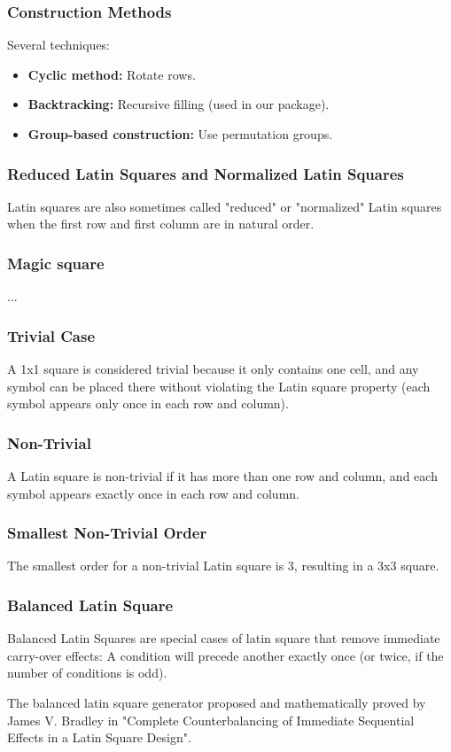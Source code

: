 \documentclass{beamer}
\begin{document}
\begin{frame}
\frametitle{Construction Methods}
Several techniques:
\begin{itemize}
  \item \textbf{Cyclic method:} Rotate rows.
  \item \textbf{Backtracking:} Recursive filling (used in our package).
  \item \textbf{Group-based construction:} Use permutation groups.
\end{itemize}
\end{frame}

\begin{frame}
\frametitle{Reduced Latin Squares and Normalized Latin Squares}
Latin squares are also sometimes called "reduced" or "normalized" Latin squares when the first row and first column are in natural order. 
\end{frame}

\begin{frame}
\frametitle{Magic square}
...
\end{frame}

\begin{frame}
\frametitle{Trivial Case}
A 1x1 square is considered trivial because it only contains one cell, and any symbol can be placed there without violating the Latin square property (each symbol appears only once in each row and column).
\end{frame}

\begin{frame}
\frametitle{Non-Trivial}
A Latin square is non-trivial if it has more than one row and column, and each symbol appears exactly once in each row and column.
\end{frame}

\begin{frame}
\frametitle{Smallest Non-Trivial Order}
The smallest order for a non-trivial Latin square is 3, resulting in a 3x3 square.
\end{frame}

\begin{frame}
\frametitle{Balanced Latin Square}
Balanced Latin Squares are special cases of latin square that remove immediate carry-over effects: A condition will precede another exactly once (or twice, if the number of conditions is odd).

The balanced latin square generator proposed and mathematically proved by James V. Bradley in "Complete Counterbalancing of Immediate Sequential Effects in a Latin Square Design".
\end{frame}
\end{document}
